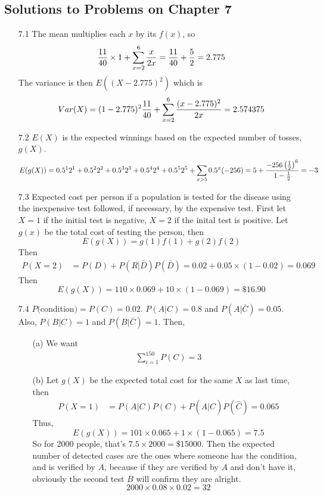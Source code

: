 \documentclass[english, 11pt]{article}
\begin{document}
  \subsection{Solutions to Problems on Chapter 7}

  \begin{itemize}
    \item[7.1] The mean multiplies each $x$ by its $f(x)$, so
  \[ \frac{11}{40}\times 1 + \sum_{x=2}^6\frac{x}{2x} = \frac{11}{40} + \frac{5}{2} = 2.775 \]
  The variance is then $E((X-2.775)^2)$ which is
  \[ Var(X) = (1 - 2.775)^2 \frac{11}{40} + \sum_{x=2}^6 \frac{(x-2.775)^2}{2x} = 2.574375 \]

  \item[7.2] $E(X)$ is the expected winnings based on the expected number of tosses, $g(X)$.
  \[ E(g(X)) = 0.5^12^1 + 0.5^22^2 + 0.5^32^3 + 0.5^42^4 + 0.5^52^5 + \sum_{x > 5}0.5^x(-256) = 5 + \frac{-256 \left( \frac{1}{2} \right)^6}{1 - \frac{1}{2}} = -3\]


  \item[7.3] Expected cost per person if a population is tested for the disease using the inexpensive test followed, if necessary, by the expensive test. First let $X = 1$ if the initial test is negative, $X = 2$ if the inital test is positive. Let $g(x)$ be the total cost of testing the person, then
  \[ E(g(X)) = g(1)f(1) + g(2)f(2) \]
  Then
  \begin{align*}
    P(X = 2) & = P(D) + P(R|\bar{D})P(\bar{D}) = 0.02 + 0.05\times(1-0.02) = 0.069
  \end{align*}
  Then
  \[ E(g(X)) = 110 \times 0.069 + 10 \times(1-0.069) = \$16.90 \]

  \item[7.4] $P($condition$) = P(C) = 0.02$. $P(A|C) = 0.8$ and $P(A|\bar{C}) = 0.05$. Also, $P(B|C) = 1$ and $P(B|\bar{C}) = 1$. Then,
  \begin{itemize}
    \item[(a)] We want
    \begin{align*}
      \sum_{i = 1}^{150} P(C) = 3
    \end{align*}
    \item[(b)] Let $g(X)$ be the expected total cost for the same $X$ as last time, then
    \begin{align*}
      P(X = 1) & = P(A|C)P(C) + P(A|\hat{C})P(\hat{C}) = 0.065
    \end{align*}
    Thus,
    \[ E(g(X)) = 101\times0.065 + 1\times(1-0.065) =7.5 \]
    So for 2000 people, that's $7.5\times2000 = \$15000$. Then the expected number of detected cases are the ones where someone has the condition, and is verified by $A$, because if they are verified by $A$ and don't have it, obviously the second test $B$ will confirm they are alright.
    \[ 2000\times 0.08\times0.02 = 32 \]
  \end{itemize}


\end{itemize}
\end{document}
